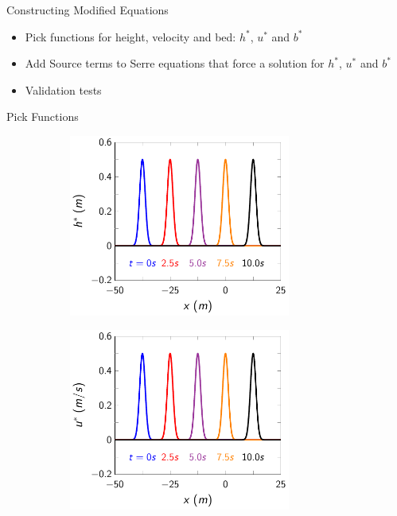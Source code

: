 \documentclass[handout]{beamer}
\begin{document}
\begin{frame}{Constructing Modified Equations}
	\begin{itemize}
		\item Pick functions for height, velocity and bed: $h^*$, $u^*$ and $b^*$
		\item Add Source terms to Serre equations that force a solution for $h^*$, $u^*$ and $b^*$
		\item Validation tests
	\end{itemize}
\end{frame}
\begin{frame}{Pick Functions}

\begin{figure}
	\centering
	\begin{subfigure}{0.5\textwidth}
		\includegraphics[width=0.8\textwidth]{./Pics/DryBed/Forced/h.pdf}
	\end{subfigure}%
	\begin{subfigure}{0.5\textwidth}
		\includegraphics[width=0.8\textwidth]{./Pics/DryBed/Forced/u.pdf}

\end{subfigure}
\end{figure}
\end{frame}
\end{document}
